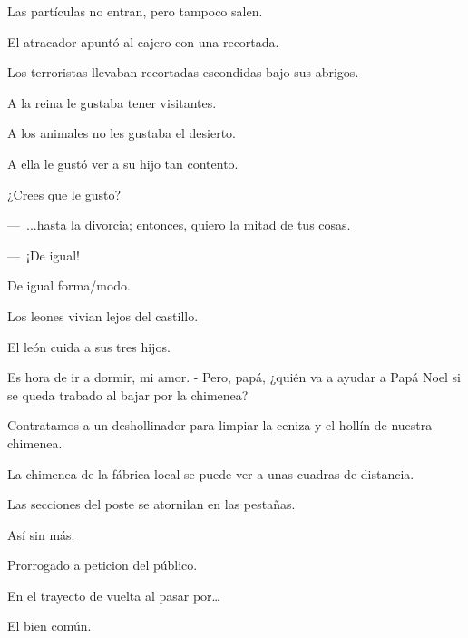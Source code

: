 \sk
Las partículas no entran, pero tampoco salen. 

\sk
El atracador apuntó al cajero con una recortada. 

\sk
Los terroristas llevaban recortadas escondidas bajo sus abrigos. 

\sk
A la reina le gustaba tener visitantes.

\sk
A los animales no les gustaba el desierto. 

\sk
A ella le gustó ver a su hijo tan contento. 

\sk
¿Crees que le gusto? 

\sk
---~...hasta la divorcia; entonces, quiero la mitad de tus cosas.

---~¡De igual! 

\sk
De igual forma/modo. 

\sk
Los leones vivian lejos del castillo.

\sk
El león cuida a sus tres hijos.

\sk
Es hora de ir a dormir, mi amor. - Pero, papá, ¿quién va a ayudar a Papá Noel si se queda trabado al bajar por la chimenea? 

\sk
Contratamos a un deshollinador para limpiar la ceniza y el hollín de nuestra chimenea. 

\sk
La chimenea de la fábrica local se puede ver a unas cuadras de distancia. 

\sk
Las secciones del poste se atornilan en las pestañas.

\sk
Así sin más. 

\sk
Prorrogado a peticion del público. 

\sk
En el trayecto de vuelta al pasar por\ldots{} 

\sk
El bien común. 

